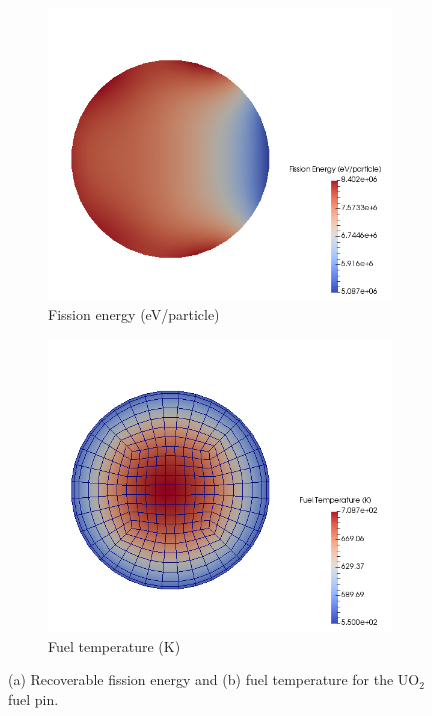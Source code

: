 \documentclass[letterpaper]{physor2018}
\begin{document}
\begin{figure}[!htb]
\centering
\begin{subfigure}{.5\textwidth}
  \centering
  \includegraphics[width=0.75\linewidth]{../Figures/kappa_fission.png}
  \caption{Fission energy (eV/particle)}
\end{subfigure}%
\begin{subfigure}{.5\textwidth}
  \centering
  \includegraphics[width=0.75\linewidth]{../Figures/fuel_temp.png}
  \caption{Fuel temperature (K)}
\end{subfigure}
\caption{(a) Recoverable fission energy and (b)
fuel temperature for the UO$_2$ fuel pin.}
\label{fig:openmc_buffalo}
\end{figure}
\end{document}
